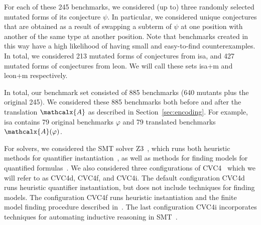 \documentclass[runningheads,a4paper]{llncs}
\newcommand\cvcd{CVC4d\xspace}
\newcommand\cvcf{CVC4f\xspace}
\newcommand\cvci{CVC4i\xspace}
\newcommand\bench{\ttfamily}
\newcommand\cvc{CVC4\xspace}
\newcommand\ziii{Z3\xspace}
\newcommand{\conv}{\mathcalx{A}}
\begin{document}
For each of these 245 benchmarks, we considered (up to) three randomly selected mutated forms of its conjecture $\psi$.
In particular, we considered unique conjectures that are obtained as a result of swapping a subterm of $\psi$ at one position
with another of the same type at another position.
Note that benchmarks created in this way have a high likelihood of having small and easy-to-find counterexamples.
In total, we considered 213 mutated forms of conjectures from {\bench isa}, and 427 mutated forms of conjectures from {\bench leon}.
We will call these sets {\bench isa+m} and {\bench leon+m} respectively.

In total, our benchmark set consisted of 885 benchmarks (640 mutants plus the original 245).
We considered these 885 benchmarks both before and after the translation $\conv$ as described in Section~\ref{sec:encoding}.
For example, {\bench isa} contains 79 original benchmarks $\varphi$
and 79 translated benchmarks $\conv(\varphi)$.

For solvers, we considered the SMT solver \ziii~\cite{de-moura-bjoerner-2008},
which runs both heuristic methods for quantifier instantiation~\cite{DBLP:conf/cade/MouraB07},
as well as methods for finding models for quantified formulas~\cite{GeDeM-CAV-09}.
We also considered three configurations of \cvc~\cite{barrett-et-al-2011} which we will refer to as \cvcd, \cvcf, and \cvci.
The default configuration \cvcd runs heuristic quantifier instantiation,
but does not include techniques for finding models.
The configuration \cvcf runs heuristic instantiation and the finite model finding procedure described in~\cite{ReyEtAl-1-RR-13,reynolds-et-al-2013}.
The last configuration \cvci incorporates techniques for automating inductive reasoning in SMT~\cite{reynolds-kuncak-2015}.
\end{document}
